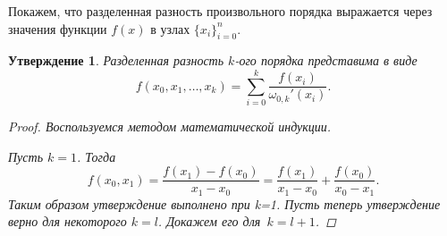\documentclass[11pt,a4paper,twoside,listtotoc,bibtotoc]{report}
\numberwithin{equation}{section}
\newtheorem*{statement}{Утверждение}
\theoremstyle{definition}
\theoremstyle{plain}
\begin{document}
Покажем, что разделенная разность произвольного порядка выражается
через значения функции $f(x)$ в узлах $\{x_i\}_{i=0}^n$.
%
\begin{statement}
%
    Разделенная разность $k$-ого порядка представима в виде
    \begin{equation}
        \label{distr_subtr}
        f(x_0, x_{1}, \ldots, x_{k})=\sum_{i=0}^{k}{\frac{f(x_i)}
        {\omega_{0,k}'(x_i)}}.
    \end{equation}
    \begin{proof}
        Воспользуемся методом математической индукции.

        \noindent
        Пусть $k = 1$. Тогда
        $$
            f(x_0, x_1)=\frac{f(x_1)-f(x_0)}{x_1-x_0}=\frac{f(x_1)}{x_1-x_0}+
            \frac{f(x_0)}{x_0-x_1}.
        $$
        Таким образом утверждение выполнено при k=1. Пусть теперь
        утверждение верно для некоторого $k=l$. Докажем его для~$k=l+1$.


\end{proof}
\end{statement}
\end{document}

